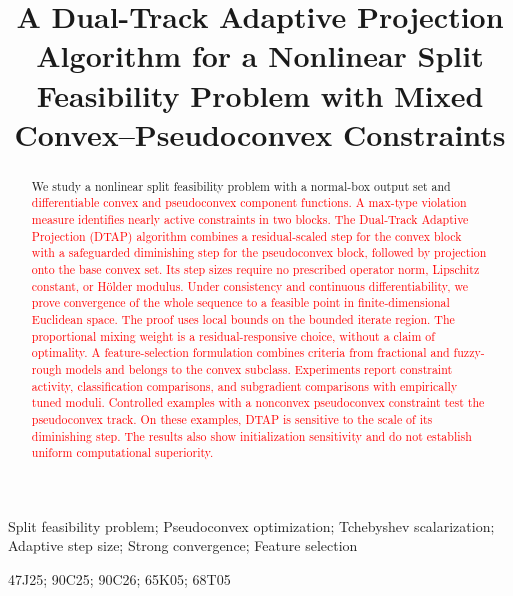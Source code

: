 \documentclass[]{interact}
\theoremstyle{plain}
\theoremstyle{definition}
\theoremstyle{remark}
\newcommand{\dtap}{\textsc{DTAP}}
\begin{document}
\title{A Dual-Track Adaptive Projection Algorithm for a Nonlinear Split Feasibility Problem with Mixed Convex--Pseudoconvex Constraints}

\author{
}

\maketitle

\begin{abstract}
We study a nonlinear split feasibility problem with a normal-box output set and \leavevmode\textcolor{red}{differentiable convex and pseudoconvex component functions. A max-type violation measure identifies nearly active constraints in two blocks. The Dual-Track Adaptive Projection (\dtap) algorithm combines a residual-scaled step for the convex block with a safeguarded diminishing step for the pseudoconvex block, followed by projection onto the base convex set. Its step sizes require no prescribed operator norm, Lipschitz constant, or H\"older modulus. Under consistency and continuous differentiability, we prove convergence of the whole sequence to a feasible point in finite-dimensional Euclidean space. The proof uses local bounds on the bounded iterate region. The proportional mixing weight is a residual-responsive choice, without a claim of optimality. A feature-selection formulation combines criteria from fractional and fuzzy-rough models and belongs to the convex subclass. Experiments report constraint activity, classification comparisons, and subgradient comparisons with empirically tuned moduli. Controlled examples with a nonconvex pseudoconvex constraint test the pseudoconvex track. On these examples, DTAP is sensitive to the scale of its diminishing step. The results also show initialization sensitivity and do not establish uniform computational superiority.}
\end{abstract}

\begin{keywords}
Split feasibility problem; Pseudoconvex optimization; Tchebyshev scalarization; Adaptive step size; Strong convergence; Feature selection
\end{keywords}
\begin{amscode}
47J25; 90C25; 90C26; 65K05; 68T05
\end{amscode}
\end{document}
